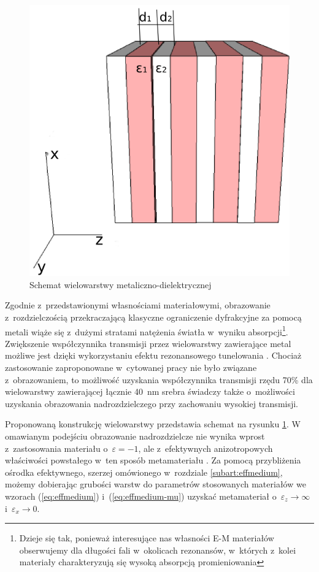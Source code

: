 \begin{figure}[tbh]
	\centering
	\includegraphics[width=.5\textwidth]{images/multilayer/multilayer-3d.png}
	\caption{Schemat wielowarstwy metaliczno-dielektrycznej}
	\label{fig:mulschem}
\end{figure}

Zgodnie z~przedstawionymi własnościami materiałowymi, obrazowanie z~rozdzielczością przekraczającą klasyczne ograniczenie dyfrakcyjne za pomocą metali wiąże się z~dużymi stratami natężenia światła w~wyniku absorpcji\footnote{Dzieje się tak, ponieważ interesujące nas własności E-M materiałów obserwujemy dla długości fali w~okolicach rezonansów, w~których z~kolei materiały charakteryzują się wysoką absorpcją promieniowania}. Zwiększenie współczynnika transmisji przez wielowarstwy zawierające metal możliwe jest dzięki wykorzystaniu efektu rezonansowego tunelowania \cite{scalora-transparentmetal}. Chociaż zastosowanie zaproponowane w~cytowanej pracy nie było związane z~obrazowaniem, to możliwość uzyskania współczynnika transmisji rzędu 70\% dla wielowarstwy zawierającej łącznie 40~nm srebra świadczy także o~możliwości uzyskania obrazowania nadrozdzielczego przy zachowaniu wysokiej transmisji. 

Proponowaną konstrukcję wielowarstwy przedstawia schemat na rysunku \ref{fig:mulschem}. W omawianym podejściu obrazowanie nadrozdzielcze nie wynika wprost z~zastosowania materiału o~$\varepsilon = -1$, ale z~efektywnych anizotropowych właściwości powstałego w~ten sposób  metamateriału \cite{ramakrishna2003imaging}. Za pomocą przybliżenia ośrodka efektywnego, szerzej omówionego w~rozdziale \ref{subart:effmedium}, możemy dobierając grubości warstw do parametrów stosowanych materiałów we wzorach (\ref{eq:effmedium}) i~(\ref{eq:effmedium-mu})  uzyskać metamateriał o~$\varepsilon_z \to \infty$ i~$\varepsilon_x \to 0$.




